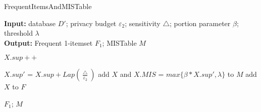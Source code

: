\documentclass{article}
\begin{document}
\begin{algorithm}[t]
    \caption{FrequentItemsAndMISTable}
    \hspace*{0.02in} {\bf Input:} %
    database $D'$; privacy budget $\varepsilon_2$; sensitivity $\bigtriangleup$; portion parameter $\beta$; threshold $\lambda$\\
    \hspace*{0.02in} {\bf Output:} %
    Frequent 1-itemset $F_1$; MISTable $M$

    \begin{algorithmic}[1]
                \State $X.sup++$                 
            \EndFor    
        \EndFor

        \State $X.sup'$ = $X.sup + Lap(\frac{\bigtriangleup}{\varepsilon_2})$
        \State add $X$ and $X.MIS$ = $max\{ \beta * X.sup', \lambda\}$ to $M$
            \State add $X$ to $F$
            \EndIf
        \EndFor
        
    \State \Return $F_1$; $M$
    \end{algorithmic} 

\end{algorithm}
\end{document}
